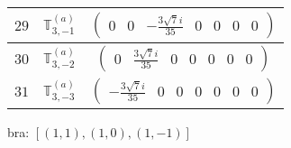 \documentclass[fleqn,8pt,landscape]{jsarticle}
\begin{document}
\begin{center}
\begin{longtable}{ccc}
$ 29 $ & $ \mathbb{T}_{3,-1}^{(a)} $ & $ \begin{pmatrix} 0 & 0 & - \frac{3 \sqrt{7} i}{35} & 0 & 0 & 0 & 0 \end{pmatrix} $ \\ \hline
$ 30 $ & $ \mathbb{T}_{3,-2}^{(a)} $ & $ \begin{pmatrix} 0 & \frac{3 \sqrt{7} i}{35} & 0 & 0 & 0 & 0 & 0 \end{pmatrix} $ \\ \hline
$ 31 $ & $ \mathbb{T}_{3,-3}^{(a)} $ & $ \begin{pmatrix} - \frac{3 \sqrt{7} i}{35} & 0 & 0 & 0 & 0 & 0 & 0 \end{pmatrix} $ \\
\end{longtable}
\end{center}
bra: $[(1,1),(1,0),(1,-1)]$
\end{document}
